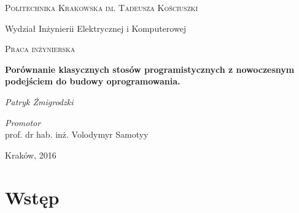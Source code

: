 \documentclass[12pt,twoside]{article}
\begin{document}
	\clearpage{}\begin{titlepage}
	\centering
	{\scshape\LARGE Politechnika Krakowska 
	\break im. Tadeusza Kościuszki \par}
	\vspace{0.5cm}
	{\large Wydział Inżynierii Elektrycznej i Komputerowej\par}
	\vspace{1cm}
	{\scshape\LARGE Praca inżynierska\par}
	\vspace{1.5cm}
	{\LARGE\bfseries Porównanie klasycznych stosów programistycznych z nowoczesnym podejściem do budowy oprogramowania.\par}
	\vspace{1.5cm}
	{\LARGE\itshape Patryk Żmigrodzki\par}
	\vspace{1cm}

	\vfill
	
								\large
				\emph{Promotor}\\
				prof. dr hab. inż. Volodymyr Samotyy
																							
	\vfill

	{\large Kraków, 2016\par}
\end{titlepage}\clearpage{}
	\tableofcontents
	
	\clearpage{}\section{Wstęp}\label{wstux119p}
\end{document}
